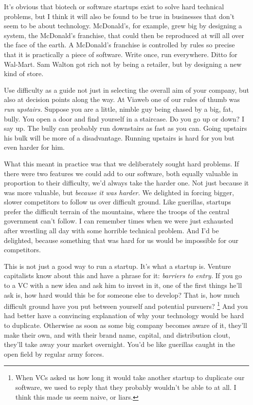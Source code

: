 \documentclass[12pt]{book}
\begin{document}
It's obvious that biotech or software startups exist to solve hard
technical problems, but I think it will also be found to be true in
businesses that don't seem to be about technology. McDonald's, for
example, grew big by designing a system, the McDonald's franchise, that
could then be reproduced at will all over the face of the earth. A
McDonald's franchise is controlled by rules so precise that it is
practically a piece of software. Write once, run everywhere. Ditto for
Wal-Mart. Sam Walton got rich not by being a retailer, but by designing
a new kind of store.

Use difficulty as a guide not just in selecting the overall aim of your
company, but also at decision points along the way. At Viaweb one of our
rules of thumb was \emph{run upstairs.} Suppose you are a little, nimble
guy being chased by a big, fat, bully. You open a door and find yourself
in a staircase. Do you go up or down? I say up. The bully can probably
run downstairs as fast as you can. Going upstairs his bulk will be more
of a disadvantage. Running upstairs is hard for you but even harder for
him.

What this meant in practice was that we deliberately sought hard
problems. If there were two features we could add to our software, both
equally valuable in proportion to their difficulty, we'd always take the
harder one. Not just because it was more valuable, but \emph{because it
was harder.} We delighted in forcing bigger, slower competitors to
follow us over difficult ground. Like guerillas, startups prefer the
difficult terrain of the mountains, where the troops of the central
government can't follow. I can remember times when we were just
exhausted after wrestling all day with some horrible technical problem.
And I'd be delighted, because something that was hard for us would be
impossible for our competitors.

This is not just a good way to run a startup. It's what a startup is.
Venture capitalists know about this and have a phrase for it:
\emph{barriers to entry.} If you go to a VC with a new idea and ask him
to invest in it, one of the first things he'll ask is, how hard would
this be for someone else to develop? That is, how much difficult ground
have you put between yourself and potential pursuers?
\footnote{When VCs asked us how long it would take another startup to
duplicate our software, we used to reply that they probably wouldn't be
able to at all. I think this made us seem naive, or liars.} And you had better have a convincing explanation
of why your technology would be hard to duplicate. Otherwise as soon as
some big company becomes aware of it, they'll make their own, and with
their brand name, capital, and distribution clout, they'll take away
your market overnight. You'd be like guerillas caught in the open field
by regular army forces.
\end{document}
